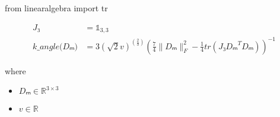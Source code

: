 \documentclass[12pt]{article}
\begin{document}
from linearalgebra import tr

\begin{align*}
\textit{J₃} & = \mathbb{ 1 }_{ 3,3 } \\
\textit{k\_angle(Dₘ)} & = 3\left(  \sqrt{2}\textit{v} \right)^{\left( \frac{2}{3} \right)}\left( \frac{7}{4}\|\textit{Dₘ}\|_F^{2} - \frac{1}{4}tr\left( \textit{J₃}\textit{Dₘ}^T\textit{Dₘ} \right) \right)^{-1}
\end{align*}

where
\begin{itemize}
\item $\textit{Dₘ} \in \mathbb{R}^{ 3 \times 3 }$
\item $\textit{v} \in \mathbb{{R}}$
\end{itemize}
\end{document}
